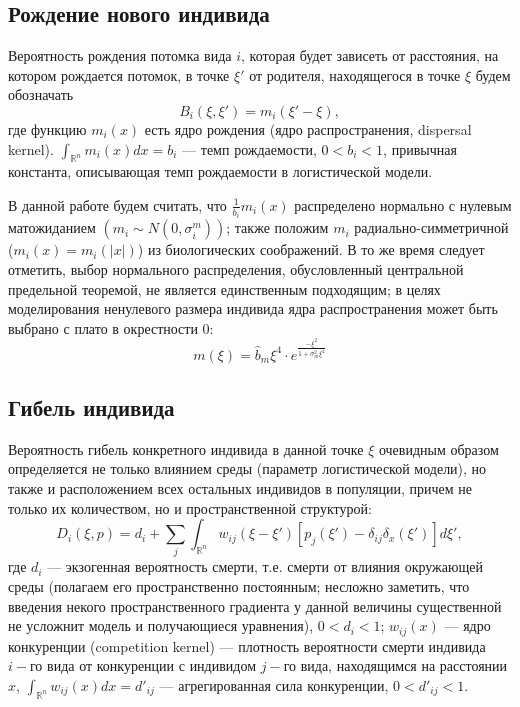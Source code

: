 \subsection{Рождение нового индивида}

Вероятность рождения потомка вида $i$, которая будет зависеть от расстояния, на котором рождается потомок, в точке $ \xi' $ от родителя, находящегося в точке $ \xi $ будем обозначать
\begin{equation*}
B_{i}(\xi,\xi')=m_{i}(\xi'-\xi),
\end{equation*}
где функцию $ m_{i}(x) $ есть ядро рождения (ядро распространения, dispersal kernel). $ \int_{\mathbb{R}^{n}}m_{i}(x)dx=b_{i} $ --- темп рождаемости, $ 0<b_{i}<1 $, привычная константа, описывающая темп рождаемости в логистической модели. 

В данной работе будем считать, что $ \frac{1}{b_{i}}m_{i}(x) $ распределено нормально с нулевым матожиданием $ \left(m_{i}\sim N(0,\sigma_{i}^{m})\right) $; также положим $ m_{i} $ радиально-симметричной ($ m_{i}(x)=m_{i}(|x|) $) из биологических соображений. В то же время следует отметить, выбор нормального распределения, обусловленный центральной предельной теоремой, не является единственным подходящим; в целях моделирования ненулевого размера индивида ядра распространения может быть выбрано с плато в окрестности 0:
\begin{equation*}
m(\xi)=\hat{b}_m \xi^4 \cdot e^\frac{-\xi^2}{1+\sigma^2_m\xi^4}
\end{equation*}


\subsection{Гибель индивида}

Вероятность гибель конкретного индивида в данной точке $\xi$ очевидным образом определяется не только влиянием среды (параметр логистической модели), но также и расположением всех остальных индивидов в популяции, причем не только их количеством, но и пространственной структурой:
\begin{equation*}
D_{i}(\xi,p)=d_{i}+\sum_{j}\int_{\mathbb{R}^{n}}w_{ij}\left(\xi-\xi'\right)\left[p_{j}(\xi')-\delta_{ij}\delta_{x}(\xi')\right]d\xi',
\end{equation*}
где $ d_{i} $ --- экзогенная вероятность смерти, т.е. смерти от влияния окружающей среды (полагаем его пространственно постоянным; несложно заметить, что введения некого пространственного градиента у данной величины существенной не усложнит модель и получающиеся уравнения), $ 0<d_{i}<1 $; $ w_{ij}(x) $ --- ядро конкуренции (competition kernel) --- плотность вероятности смерти индивида $ i- $го вида от конкуренции с индивидом $ j- $го вида, находящимся на расстоянии $ x $, $ \int_{\mathbb{R}^{n}}w_{ij}(x)dx=d'_{ij} $ --- агрегированная сила конкуренции, $ 0<d'_{ij}<1 $. 

